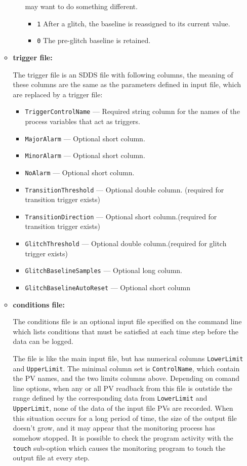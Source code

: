 \begin{itemize}
\begin{itemize}
\begin{itemize}
                may want to do something different. 
 \begin{itemize}       
        \item {\tt 1}   After a glitch, the baseline is reassigned to its current value.
        \item {\tt 0}   The pre-glitch baseline is retained. 
\end{itemize}
\end{itemize}
\item {\bf trigger file:}\par
The trigger file is an SDDS file with following columns, the meaning of these columns are the same as
the parameters defined in input file, which are replaced by a trigger file:
\begin{itemize}
        \item {\tt TriggerControlName} --- Required string column for the names of the process variables
                that act as triggers.
        \item {\tt MajorAlarm} --- Optional short column.
        \item {\tt MinorAlarm} --- Optional short column.
        \item {\tt NoAlarm} --- Optional short column.
        \item {\tt TransitionThreshold} --- Optional double column. (required for transition trigger exists)
        \item {\tt TransitionDirection} --- Optional short column.(required for transition trigger exists)
        \item {\tt GlitchThreshold} --- Optional double column.(required for glitch trigger exists)
        \item {\tt GlitchBaselineSamples} --- Optional long column.
        \item {\tt GlitchBaselineAutoReset} --- Optional short column
\end{itemize}
\item {\bf conditions file:} \par
The conditions file is an optional input file specified on the command line which lists
conditions that must be satisfied at each time step before the data can be logged.

The file is like the main input file, but has numerical columns \verb+LowerLimit+ and \verb+UpperLimit+.
The minimal column set is \verb+ControlName+, which contain the PV names, and the two limits columns above.
Depending on comand line options, when any or all PV readback from this file
is outstide the range defined by the corresponding data from \verb+LowerLimit+ and \verb+UpperLimit+,
none of the data of the input file PVs are recorded. 
When this situation occurs for a long period of time, the size of the output file doesn't
grow, and it may appear that the monitoring process has somehow stopped.
It is possible to check the program activity with the \verb+touch+ sub-option
which causes the monitoring program to touch the output file at every step.


\end{itemize}
\end{itemize}
